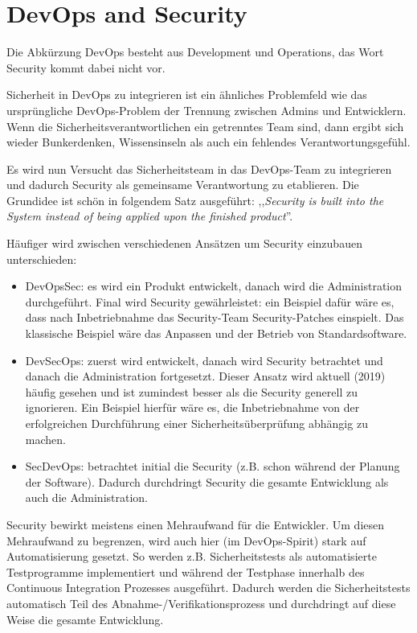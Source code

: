 \section{DevOps and Security}

Die Abkürzung DevOps besteht aus Development und Operations, das Wort Security kommt dabei nicht vor.

Sicherheit in DevOps zu integrieren ist ein ähnliches Problemfeld wie das ursprüngliche DevOps-Problem der Trennung zwischen Admins und Entwicklern. Wenn die Sicherheitsverantwortlichen ein getrenntes Team sind, dann ergibt sich wieder Bunkerdenken, Wissensinseln als auch ein fehlendes Verantwortungsgefühl.

Es wird nun Versucht das Sicherheitsteam in das DevOps-Team zu integrieren und dadurch Security als gemeinsame Verantwortung zu etablieren. Die Grundidee ist schön in folgendem Satz ausgeführt: ,,\textit{Security is built into the System instead of being applied upon the finished product}''.

Häufiger wird zwischen verschiedenen Ansätzen um Security einzubauen unterschieden:

\begin{itemize}
	\item DevOpsSec: es wird ein Produkt entwickelt, danach wird die Administration durchgeführt. Final wird Security gewährleistet: ein Beispiel dafür wäre es, dass nach Inbetriebnahme das Security-Team Security-Patches einspielt. Das klassische Beispiel wäre das Anpassen und der Betrieb von Standardsoftware.
	\item DevSecOps: zuerst wird entwickelt, danach wird Security betrachtet und danach die Administration fortgesetzt. Dieser Ansatz wird aktuell (2019) häufig gesehen und ist zumindest besser als die Security generell zu ignorieren. Ein Beispiel hierfür wäre es, die Inbetriebnahme von der erfolgreichen Durchführung einer Sicherheitsüberprüfung abhängig zu machen.
	\item SecDevOps: betrachtet initial die Security (z.B. schon während der Planung der Software). Dadurch durchdringt Security die gesamte Entwicklung als auch die Administration.
\end{itemize}

Security bewirkt meistens einen Mehraufwand für die Entwickler. Um diesen Mehraufwand zu begrenzen, wird auch hier (im DevOps-Spirit) stark auf Automatisierung gesetzt. So werden z.B. Sicherheitstests als automatisierte Testprogramme implementiert und während der Testphase innerhalb des Continuous Integration Prozesses ausgeführt. Dadurch werden die Sicherheitstests automatisch Teil des Abnahme-/Verifikationsprozess und durchdringt auf diese Weise die gesamte Entwicklung.


